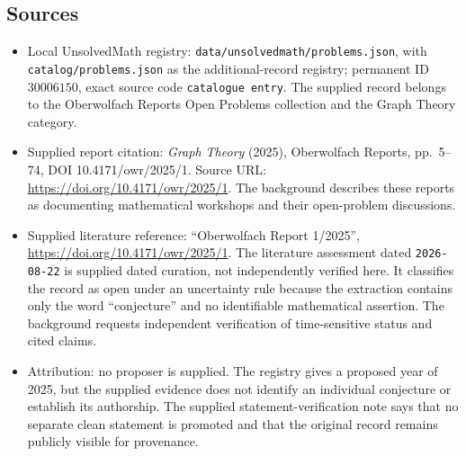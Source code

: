 \documentclass[11pt]{article}
\begin{document}
\subsection{Sources}
\begin{itemize}
\item Local UnsolvedMath registry: \texttt{data/unsolvedmath/problems.json}, with \texttt{catalog/problems.json} as the additional-record registry; permanent ID \(30006150\), exact source code \texttt{catalogue entry}. The supplied record belongs to the Oberwolfach Reports Open Problems collection and the Graph Theory category.
\item Supplied report citation: \emph{Graph Theory} (2025), Oberwolfach Reports, pp.~5--74, DOI 10.4171/owr/2025/1. Source URL: \url{https://doi.org/10.4171/owr/2025/1}. The background describes these reports as documenting mathematical workshops and their open-problem discussions.
\item Supplied literature reference: ``Oberwolfach Report 1/2025'', \url{https://doi.org/10.4171/owr/2025/1}. The literature assessment dated \texttt{2026-08-22} is supplied dated curation, not independently verified here. It classifies the record as open under an uncertainty rule because the extraction contains only the word ``conjecture'' and no identifiable mathematical assertion. The background requests independent verification of time-sensitive status and cited claims.
\item Attribution: no proposer is supplied. The registry gives a proposed year of 2025, but the supplied evidence does not identify an individual conjecture or establish its authorship. The supplied statement-verification note says that no separate clean statement is promoted and that the original record remains publicly visible for provenance.
\end{itemize}
\end{document}
